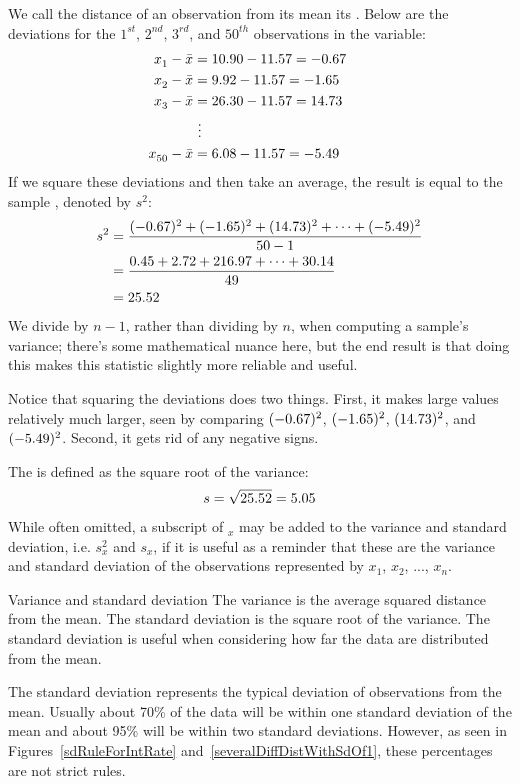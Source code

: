 We call the distance of an observation from its mean its . Below are the deviations for the $1^{st}_{}$, $2^{nd}_{}$, $3^{rd}$, and $50^{th}_{}$ observations in the  variable:
\begin{align*}
x_1^{}-\bar{x} &= 10.90 - 11.57{} = -0.67 \hspace{5mm}\text{ } \\
x_2^{}-\bar{x} &= 9.92 - 11.57{} = -1.65 \\
x_3^{}-\bar{x} &= 26.30 - 11.57{} = 14.73 \\
			&\ \vdots \\
x_{50}^{}-\bar{x} &= 6.08 - 11.57{} = -5.49
\end{align*}
If we square these deviations and then take an average,
the result is equal to the sample
\label{varianceIsDefined},
denoted by $s_{}^2$:
\begin{align*}
s_{}^2 &= \frac{(-0.67)_{}^2 + (-1.65)_{}^2 + (14.73)_{}^2 + \cdots + (-5.49)_{}^2}{50{}-1} \\
	&= \frac{0.45 + 2.72 + 216.97 + \cdots + 30.14}{49} \\
	&= 25.52{}
\end{align*}
We divide by $n - 1$, rather than dividing by $n$,
when computing a sample's variance;
there's some mathematical nuance here, but the end result is that
doing this makes this statistic slightly more reliable and useful.

Notice that squaring the deviations does two things.
First, it makes large values relatively much larger,
seen by comparing $(-0.67)^2$, $(-1.65)^2$, $(14.73)^2$,
and $(-5.49)^2$.
Second, it gets rid of any negative signs.

The  is defined as the square root of the variance:
\begin{align*}
s = \sqrt{25.52{}} = 5.05{}
\end{align*}
While often omitted, a subscript of $_x$ may be added
to the variance and standard deviation,
i.e. $s_x^2$ and $s_x^{}$, if it is useful as a reminder
that these are the variance and standard deviation of the
observations represented by $x_1^{}$, $x_2^{}$, ..., $x_n^{}$.

\begin{onebox}{Variance and standard deviation}
  The variance is the average squared distance from the mean.
  The standard deviation is the square root of the variance.
  The standard deviation is useful when considering how far
  the data are distributed from the mean.\vspace{3mm}

  The standard deviation represents the typical deviation
  of observations from the mean.
  Usually about 70\% of the data will be within one standard
  deviation of the mean and about 95\% will be within two
  standard deviations.
  However, as seen in Figures~\ref{sdRuleForIntRate}
  and~\ref{severalDiffDistWithSdOf1}, these percentages are
  not strict rules.
\end{onebox}

